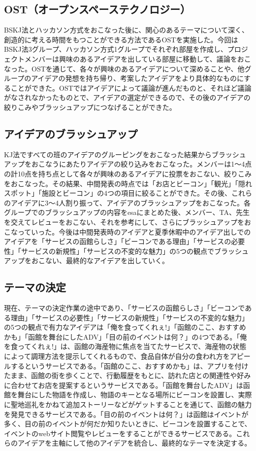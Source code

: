 \subsection{OST（オープンスペーステクノロジー）}
BSKJ法とハッカソン方式をおこなった後に、関心のあるテーマについて深く、創造的に考える時間をもつことができる方法であるOSTを実施した。今回はBSKJ法3グループ、ハッカソン方式1グループでそれぞれ部屋を作成し、プロジェクトメンバーは興味のあるアイデアを出している部屋に移動して、議論をおこなった。OSTを通じて、各々が興味のあるアイデアについて深めることや、他グループのアイデアの発想を持ち帰り、考案したアイデアをより具体的なものにすることができた。OSTではアイデアによって議論が進んだものと、それほど議論がなされなかったものとで、アイデアの選定ができるので、その後のアイデアの絞りこみやブラッシュアップにつなげることができた。

\subsection{アイデアのブラッシュアップ}
KJ法ですべての班のアイデアのグルーピングをおこなった結果からブラッシュアップをおこなうにあたりアイデアの絞り込みをおこなった。メンバーは1～4点の計10点を持ち点として各々が興味のあるアイデアに投票をおこない、絞りこみをおこなった。その結果、中間発表の時点では「お店とビーコン」「観光」「隠れスポット」「施設とビーコン」の4つの項目に絞ることができた。その後、これらのアイデアに3～4人割り振って、アイデアのブラッシュアップをおこなった。各グループでのブラッシュアップの内容をesaにまとめた後、メンバー、TA、先生を交えてレビューをおこない、それを参考にして、さらにブラッシュアップをおこなっていった。今後は中間発表時のアイデアと夏季休暇中のアイデア出しでのアイデアを「サービスの函館らしさ」「ビーコンである理由」「サービスの必要性」「サービスの新規性」「サービスの不変的な魅力」の5つの観点でブラッシュアップをおこない、最終的なアイデアを出していく。

\subsection{テーマの決定}
現在、テーマの決定作業の途中であり、「サービスの函館らしさ」「ビーコンである理由」「サービスの必要性」「サービスの新規性」「サービスの不変的な魅力」の5つの観点で有力なアイデアは「俺を食ってくれぇ!」「函館のここ、おすすめかも」「函館を舞台にしたADV」「目の前のイベントは何？」の4つである。「俺を食ってくれぇ!」は、函館の海産物に焦点を当てたサービスで、海産物の状態によって調理方法を提示してくれるもので、食品自体が自分の食われ方をアピールするというサービスである。「函館のここ、おすすめかも」は、アプリを付けたまま、函館の街を歩くことで、行動履歴をもとに、訪れた店との関連性や好みに合わせてお店を提案するというサービスである。「函館を舞台したADV」は函館を舞台にした物語を作成し、物語のキーとなる場所にビーコンを設置し、実際に聖地巡礼をかねて追加ストーリーなどがゲットすることを通じて、函館の魅力を発見できるサービスである。「目の前のイベントは何？」は函館はイベントが多く、目の前のイベントが何だか知りたいときに、ビーコンを設置することで、イベントのwebサイト閲覧やレビューをすることができるサービスである。これらのアイデアを主軸にして他のアイデアを統合し、最終的なテーマを決定する。

